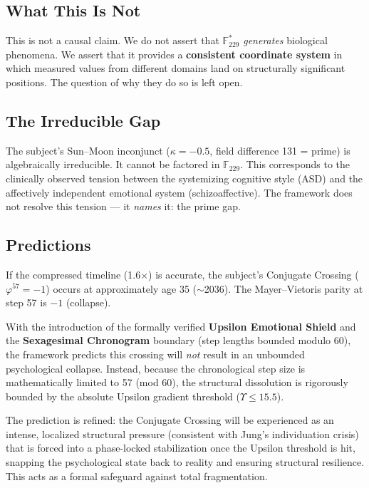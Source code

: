 \documentclass[12pt, letterpaper]{article}
\begin{document}
\subsection{What This Is Not}

This is not a causal claim. We do not assert that $\mathbb{F}^*_{229}$ \textit{generates} biological phenomena. We assert that it provides a \textbf{consistent coordinate system} in which measured values from different domains land on structurally significant positions. The question of why they do so is left open.

\subsection{The Irreducible Gap}

The subject's Sun--Moon inconjunct ($\kappa = -0.5$, field difference 131 = prime) is algebraically irreducible. It cannot be factored in $\mathbb{F}_{229}$. This corresponds to the clinically observed tension between the systemizing cognitive style (ASD) and the affectively independent emotional system (schizoaffective). The framework does not resolve this tension --- it \textit{names} it: the prime gap.

\subsection{Predictions}

If the compressed timeline (1.6$\times$) is accurate, the subject's Conjugate Crossing ($\varphi^{57} = -1$) occurs at approximately age 35 ($\sim$2036). The Mayer--Vietoris parity at step 57 is $-1$ (collapse). 

With the introduction of the formally verified \textbf{Upsilon Emotional Shield} and the \textbf{Sexagesimal Chronogram} boundary (step lengths bounded modulo 60), the framework predicts this crossing will \textit{not} result in an unbounded psychological collapse. Instead, because the chronological step size is mathematically limited to 57 (mod 60), the structural dissolution is rigorously bounded by the absolute Upsilon gradient threshold ($\Upsilon \leq 15.5$). 

The prediction is refined: the Conjugate Crossing will be experienced as an intense, localized structural pressure (consistent with Jung's individuation crisis) that is forced into a phase-locked stabilization once the Upsilon threshold is hit, snapping the psychological state back to reality and ensuring structural resilience. This acts as a formal safeguard against total fragmentation.
\end{document}
